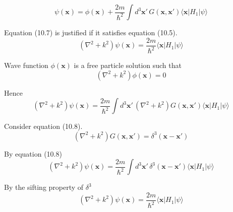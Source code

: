 


\begin{equation*}
\psi(\mathbf x)=\phi(\mathbf x)+\frac{2m}{\hbar^2}
\int d^3\mathbf x'\,G(\mathbf x,\mathbf x')
\langle\mathbf x|H_1|\psi\rangle
\tag{10.7}
\end{equation*}

Equation (10.7) is justified if it satisfies equation (10.5).
\begin{equation*}
(\nabla^2+k^2)\psi(\mathbf x)=\frac{2m}{\hbar^2}\langle\mathbf x|H_1|\psi\rangle
\tag{10.5}
\end{equation*}

Wave function $\phi(\mathbf x)$ is a free particle solution such that
\begin{equation*}
(\nabla^2+k^2)\phi(\mathbf x)=0
\end{equation*}

Hence
\begin{equation*}
(\nabla^2+k^2)\psi(\mathbf x)
=\frac{2m}{\hbar^2}\int d^3\mathbf x'\,(\nabla^2+k^2)G(\mathbf x,\mathbf x')
\langle\mathbf x|H_1|\psi\rangle
\end{equation*}

Consider equation (10.8).
\begin{equation*}
(\nabla^2+k^2)G(\mathbf x,\mathbf x')=\delta^3(\mathbf x-\mathbf x')
\tag{10.8}
\end{equation*}

By equation (10.8)
\begin{equation*}
(\nabla^2+k^2)\psi(\mathbf x)
=\frac{2m}{\hbar^2}\int d^3\mathbf x'\,\delta^3(\mathbf x-\mathbf x')
\langle\mathbf x|H_1|\psi\rangle
\end{equation*}

By the sifting property of $\delta^3$
\begin{equation*}
(\nabla^2+k^2)\psi(\mathbf x)
=\frac{2m}{\hbar^2}\langle\mathbf x|H_1|\psi\rangle
\end{equation*}


